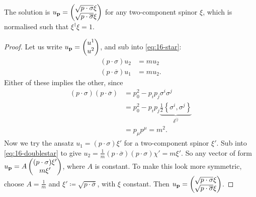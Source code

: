 \begin{claim}
  The solution is $u_{\vb{p}} = 
  \begin{pmatrix}
  \sqrt{p \cdot \sigma} \xi \\
  \sqrt{p \cdot \overline{\sigma}} \xi \\
  \end{pmatrix}$ for any two-component spinor $\xi$, which is normalised such that $\xi^{\dagger} \xi = 1$.
\end{claim}
\begin{proof}
  Let us write $u_{\vb{p}} = 
  \begin{pmatrix}
  u^1 \\
  u^2\\
  \end{pmatrix}$, and sub into \eqref{eq:16-star}:
  \begin{subequations}
    \label{eq:16-doublestar}
    \begin{align}
      (p \cdot \sigma) u_2 &= m u_2 \\
      (p \cdot \overline{\sigma}) u_1 &= m u_2.
    \end{align}
  \end{subequations}
  Either of these implies the other, since
  \begin{align}
    (p \cdot \sigma) (p \cdot \overline{\sigma}) &= p_0^2 - p_{i} p_{j} \sigma^{i} \sigma^{j} \\
						 &= p_0^2 - p_{i} p_{j} \underbrace{\frac{1}{2} \left\{ \sigma^{i}, \sigma^{j} \right\}}_{\delta^{ij}} \\
						 &= p_{\mu} p^{\mu} = m^2.
  \end{align}
  Now we try the ansatz $u_1 = (p \cdot \sigma) \xi'$ for a two-component spinor $\xi'$. Sub into \eqref{eq:16-doublestar} to give $u_2 = \frac{1}{m} (p \cdot \overline{\sigma}) (p \cdot \sigma) \chi' = m \xi'$. So any vector of form $u_{\vb{p}} = A
  \begin{pmatrix}
    (p \cdot \sigma) \xi' \\
    m \xi' \\
  \end{pmatrix}
  $, where $A$ is constant.
  To make this look more symmetric, choose $A = \frac{1}{m}$ and $\xi' \coloneqq \sqrt{p \cdot \overline{\sigma}}$, with $\xi$ constant. Then $u_{\vb{p}} = 
  \begin{pmatrix}
  \sqrt{p \cdot \sigma} \xi \\
  \sqrt{p \cdot \overline{\sigma}} \xi \\
  \end{pmatrix}
  $.
\end{proof}

